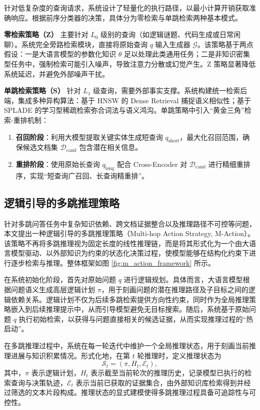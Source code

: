 针对低复杂度的查询请求，系统设计了轻量化的执行路径，以最小计算开销获取准确响应。根据前序分类器的决策，具体分为零检索与单跳检索两种基本模式。

\textbf{零检索策略（Z）} 主要针对 $L_0$ 级别的查询（如逻辑谜题、代码生成或日常闲聊）。系统完全旁路检索模块，直接将原始查询 $q$ 输入生成器 $\mathcal{G}$。该策略基于两点假设：一是大语言模型的参数化知识 $\theta$ 足以处理此类通用任务；二是非知识密集型任务中，强制检索可能引入噪声，导致注意力分散或幻觉产生。Z 策略显著降低系统延迟，并避免外部噪声干扰。

\textbf{单跳检索策略（S）} 针对 $L_1$ 级查询，需要外部事实支撑。系统构建统一检索后端，集成多种异构算法：基于 HNSW 的 Dense Retrieval 捕捉语义相似性；基于 SPLADE 的学习型稀疏检索弥合词法与语义鸿沟。单跳策略中引入“黄金三角”检索-重排机制：
\begin{enumerate}
    \item \textbf{召回阶段}：利用大模型提取关键实体生成短查询 $q_{\text{short}}$，最大化召回范围，确保候选文档集 $\mathcal{D}_{\text{cand}}$ 包含潜在相关信息。
    \item \textbf{重排阶段}：使用原始长查询 $q_{\text{long}}$ 配合 Cross-Encoder 对 $\mathcal{D}_{\text{cand}}$ 进行精细重排序，实现“短查询广召回、长查询精重排”。
\end{enumerate}

\subsection{逻辑引导的多跳推理策略}

针对多跳问答任务中复杂知识依赖、跨文档证据整合以及推理路径不可控等问题，本文提出一种逻辑引导的多跳推理策略（Multi-hop Action Strategy, M-Action）。该策略不再将多跳推理视为固定长度的线性推理链，而是将其形式化为一个由大语言模型驱动、以外部知识为约束的状态化决策过程，使模型能够在结构化约束下进行逐步检索与推理。整体框架如图 \ref{fig:m_action_framework} 所示。

在系统初始化阶段，首先对原始问题 $q$ 进行逻辑规划。具体而言，大语言模型根据问题语义生成高层逻辑计划 $\pi$，用于刻画问题的潜在推理路径及子目标之间的逻辑依赖关系。逻辑计划不仅为后续多跳检索提供方向性约束，同时作为全局推理策略嵌入到后续推理提示中，从而引导模型避免无目标搜索。随后，系统基于原始问题 $q$ 执行初始检索，以获得与问题直接相关的候选证据，从而实现推理过程的“热启动”。

在多跳推理过程中，系统在每一轮迭代中维护一个全局推理状态，用于刻画当前推理进展与知识积累情况。形式化地，在第 $t$ 轮推理时，定义推理状态为
\begin{equation}
\mathcal{S}_t = \left(\pi, H_t, \mathcal{E}_t\right),
\end{equation}
其中，$\pi$ 表示逻辑计划，$H_t$ 表示截至当前轮次的推理历史，记录模型已执行的检索查询与决策轨迹，$\mathcal{E}_t$ 表示当前已获取的证据集合，由外部知识库检索得到并经过筛选的文本片段构成。推理状态的显式建模使得多跳推理过程具备可追踪性与可控性。


